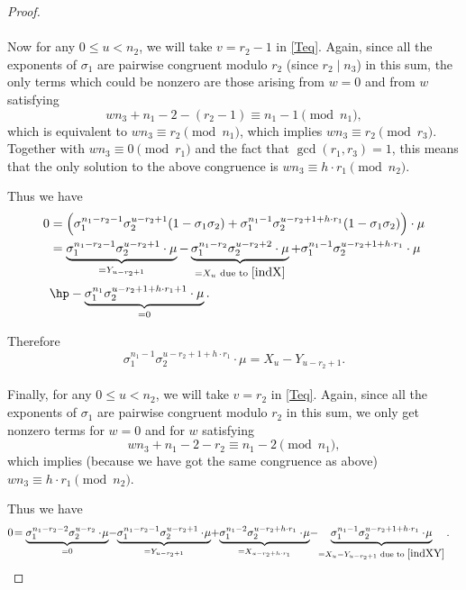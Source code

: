 \begin{proof}
\paragraph*{}
Now for any $0\leq u< n_2$, we will take $v=r_2-1$ in \eqref{Teq}. Again, since all the exponents of $\sigma_1$ are pairwise congruent modulo $r_2$ (since $r_2\mid n_3$) in this sum, the only terms which could be nonzero are those arising from $w=0$ and from $w$ satisfying
$$wn_3+n_1-2-(r_2-1)\equiv n_1-1 \pmod{n_1},$$
which is equivalent to $wn_3\equiv r_2\pmod{n_1}$, which implies $wn_3\equiv r_2\pmod{r_3}$. Together with $wn_3\equiv 0\pmod{r_1}$ and the fact that $\gcd(r_1,r_3)=1$, this means that the only solution to the above congruence is $wn_3\equiv h\cdot r_1\pmod{n_2}$.

Thus we have 
\begin{align*}
0&=\left(\sigma_1^{n_1-r_2-1}\sigma_2^{u-r_2+1}(1-\sigma_1\sigma_2)+\sigma_1^{n_1-1}\sigma_2^{u-r_2+1+h\cdot r_1}(1-\sigma_1\sigma_2)\right)\cdot \mu\\
&=\underbrace{\sigma_1^{n_1-r_2-1}\sigma_2^{u-r_2+1}\cdot\mu}_{=Y_{u-r_2+1}}-\underbrace{\sigma_1^{n_1-r_2}\sigma_2^{u-r_2+2}\cdot\mu}_{=X_u \text{ due to } \eqref{indX}}+\sigma_1^{n_1-1}\sigma_2^{u-r_2+1+h\cdot r_1}\cdot \mu\\
&\hp-\underbrace{\sigma_1^{n_1}\sigma_2^{u-r_2+1+h\cdot r_1+1}\cdot \mu}_{=0}.
\end{align*}

Therefore
\begin{equation}\label{indXY}
\sigma_1^{n_1-1}\sigma_2^{u-r_2+1+h\cdot r_1}\cdot \mu = X_u -Y_{u-r_2+1}.
\end{equation}

\paragraph*{}
Finally, for any $0\leq u< n_2$, we will take $v=r_2$ in \eqref{Teq}. Again, since all the exponents of $\sigma_1$ are pairwise congruent modulo $r_2$ in this sum, we only get nonzero terms for $w=0$ and for $w$ satisfying
$$wn_3+n_1-2-r_2\equiv n_1-2 \pmod{n_1},$$ which implies (because we have got the same congruence as above) $wn_3\equiv h\cdot r_1\pmod{n_2}$.

Thus we have 
\begin{align*}
0&\!=\underbrace{\sigma_1^{n_1-r_2-2}\sigma_2^{u-r_2}\cdot\!\mu}_{=0}\!-\!\underbrace{\sigma_1^{n_1-r_2-1}\sigma_2^{u-r_2+1}\cdot\!\mu}_{=Y_{u-r_2+1}}
\!+\!\underbrace{\sigma_1^{n_1-2}\sigma_2^{u-r_2+h\cdot r_1}\cdot \!\mu}_{=X_{u-r_2+h\cdot r_1}}\!-\!\underbrace{\sigma_1^{n_1-1}\sigma_2^{u-r_2+1+h\cdot r_1}\cdot \!\mu}_{=X_u-Y_{u-r_2+1} \text{ due to } \eqref{indXY}}.
\end{align*}


\end{proof}
